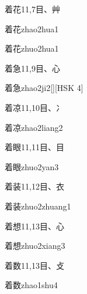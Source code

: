 \begin{Entry}{着花}{11,7}{⽬、⾋}
  \begin{Phonetics}{着花}{zhao2hua1}
  \end{Phonetics}
  \begin{Phonetics}{着花}{zhuo2hua1}
  \end{Phonetics}
\end{Entry}

\begin{Entry}{着急}{11,9}{⽬、⼼}
  \begin{Phonetics}{着急}{zhao2ji2}[][HSK 4]
  \end{Phonetics}
\end{Entry}

\begin{Entry}{着凉}{11,10}{⽬、⼎}
  \begin{Phonetics}{着凉}{zhao2liang2}
  \end{Phonetics}
\end{Entry}

\begin{Entry}{着眼}{11,11}{⽬、⽬}
  \begin{Phonetics}{着眼}{zhuo2yan3}
  \end{Phonetics}
\end{Entry}

\begin{Entry}{着装}{11,12}{⽬、⾐}
  \begin{Phonetics}{着装}{zhuo2zhuang1}
  \end{Phonetics}
\end{Entry}

\begin{Entry}{着想}{11,13}{⽬、⼼}
  \begin{Phonetics}{着想}{zhuo2xiang3}
  \end{Phonetics}
\end{Entry}

\begin{Entry}{着数}{11,13}{⽬、⽁}
  \begin{Phonetics}{着数}{zhao1shu4}
  \end{Phonetics}
\end{Entry}

